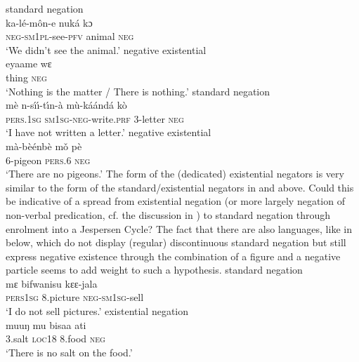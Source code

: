 \documentclass[output=paper]{langscibook}
\begin{document}
%
\ea\label{ex:tiene-animal-nothing}
%
\ea standard negation\\
\gll ka-l{\'e}-m{\^o}n-e nuk\'a kɔ\\
	\textsc{neg-sm1pl}-see-\textsc{pfv} animal \textsc{neg}\\
\glt `We didn’t see the animal.'
%
\ex negative existential\\
\gll eyaame wɛ\\
	thing \textsc{neg}\\
\glt 	`Nothing is the matter / There is nothing.'
\z\z
%
\ea\label{ex:beembe-letter-pigeon}
%
\ea standard negation\\
\gll m\`e n-s\'\i\'\i-t{\'\i}n-\`a m\`u-k{\'a\'a}nd\'a k\`o\\
	\textsc{pers.1sg}  \textsc{sm1sg-neg}{}-write.\textsc{prf}    3-letter      \textsc{neg}\\
\glt 	`I have not written a letter.'
%
\ex negative existential\\
\gll m{\`a}-b{\`e\'e}nb\`e mǒ p\`e\\
	6-pigeon \textsc{pers}.6 \textsc{neg}\\
\glt 	`There are no pigeons.'
\z\z
%
The form of the (dedicated) existential negators is very similar to the
form of the standard\slash existential negators in  and  above. Could this be indicative of a spread from existential negation (or more largely negation of non-verbal predication, cf. the discussion in ) to standard negation through enrolment into a Jespersen Cycle? The fact that there are also languages, like  in  below, which do not display (regular) discontinuous standard negation but still express negative existence through the combination of a figure and a negative particle seems to add weight to such a hypothesis. 
%
\ea\label{ex:dzing-climb-salt}
%
\ea standard negation\\
\gll mɛ bifwanisu kɛɛ-jala\\
	\textsc{pers1sg} 8.picture \textsc{neg-sm1sg}-sell\\
\glt 	`I do not sell pictures.'
%
\ex existential negation\\
\gll	muuŋ mu bisaa    ati\\
      3.salt    \textsc{loc18} 8.food \textsc{neg}\\
\glt 	`There is no salt on the food.'
\end{document}
